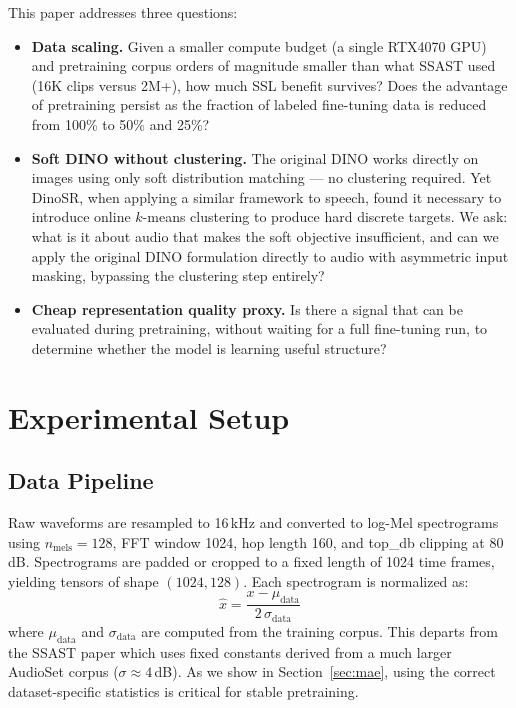 \documentclass{article}
\begin{document}
This paper addresses three questions:
\begin{itemize}
    \item \textbf{Data scaling.} Given a smaller compute budget (a single RTX4070 GPU) and pretraining corpus orders of magnitude smaller than what SSAST used (16K clips versus 2M+), how much SSL benefit survives? Does the advantage of pretraining persist as the fraction of labeled fine-tuning data is reduced from 100\% to 50\% and 25\%?
    \item \textbf{Soft DINO without clustering.} The original DINO works directly on images using only soft distribution matching — no clustering required. Yet DinoSR, when applying a similar framework to speech, found it necessary to introduce online $k$-means clustering to produce hard discrete targets. We ask: what is it about audio that makes the soft objective insufficient, and can we apply the original DINO formulation directly to audio with asymmetric input masking, bypassing the clustering step entirely?
    \item \textbf{Cheap representation quality proxy.} Is there a signal that can be evaluated during pretraining, without waiting for a full fine-tuning run, to determine whether the model is learning useful structure?
\end{itemize}

\section{Experimental Setup}
\label{sec:setup}

\subsection{Data Pipeline}

Raw waveforms are resampled to 16\,kHz and converted to log-Mel spectrograms using $n_\text{mels}{=}128$, FFT window 1024, hop length 160, and top\_db clipping at 80\,dB. Spectrograms are padded or cropped to a fixed length of 1024 time frames, yielding tensors of shape $(1024, 128)$. Each spectrogram is normalized as:
\[
    \hat{x} = \frac{x - \mu_\text{data}}{2\,\sigma_\text{data}}
\]
where $\mu_\text{data}$ and $\sigma_\text{data}$ are computed from the training corpus. This departs from the SSAST paper which uses fixed constants derived from a much larger AudioSet corpus ($\sigma \approx 4$\,dB). As we show in Section~\ref{sec:mae}, using the correct dataset-specific statistics is critical for stable pretraining.
\end{document}
